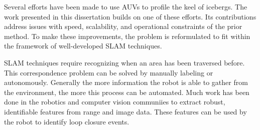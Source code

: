 Several efforts have been made to use AUVs to profile the keel of icebergs. The work presented in this dissertation builds on one of these efforts. Its contributions address issues with speed, scalability, and operational constraints of the prior method. To make these improvements, the problem is reformulated to fit within the framework of well-developed SLAM techniques. 

SLAM techniques require recognizing when an area has been traversed before. This correspondence problem can be solved by manually labeling or autonomously. Generally the more information the robot is able to gather from the environment, the more this process can be automated. Much work has been done in the robotics and computer vision communiies to extract robust, identifiable features from range and image data. These features can be used by the robot to identify loop closure events.

